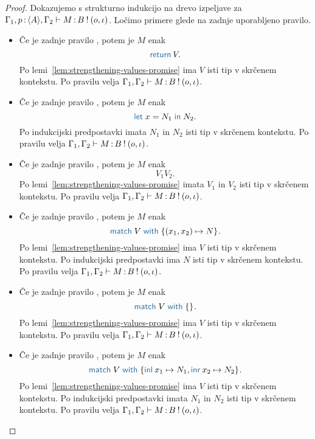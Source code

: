 \begin{proof}
	Dokazujemo s strukturno indukcijo na drevo izpeljave za $\Gamma_1, p \mathinner{:} \langle A \rangle, \Gamma_2 \vdash M \mathinner{:} B \mathbin{!} (o, \iota)$.
	Ločimo primere glede na zadnje uporabljeno pravilo.
	
	\begin{itemize}
		\item Če je zadnje pravilo , potem je $M$ enak $$\tmreturn{V}.$$
		Po lemi~\ref{lem:strengthening-values-promise} ima $V$ isti tip v skrčenem kontekstu.
		Po pravilu  velja $\Gamma_1, \Gamma_2 \vdash M \mathinner{:} B \mathbin{!} (o, \iota)$.
		
		\item Če je zadnje pravilo , potem je $M$ enak $$\tmlet{x}{N_1}{N_2}.$$
		Po indukcijski predpostavki imata $N_1$ in $N_2$ isti tip v skrčenem kontekstu.
		Po pravilu  velja $\Gamma_1, \Gamma_2 \vdash M \mathinner{:} B \mathbin{!} (o, \iota)$.
		
		\item Če je zadnje pravilo , potem je $M$ enak $$V_1 V_2.$$
		Po lemi~\ref{lem:strengthening-values-promise} imata $V_1$ in $V_2$ isti tip v skrčenem kontekstu.
		Po pravilu  velja $\Gamma_1, \Gamma_2 \vdash M \mathinner{:} B \mathbin{!} (o, \iota)$.
		
		\item Če je zadnje pravilo , potem je $M$ enak $$\tmmatch{V}{(x_1,x_2) \mapsto N}.$$ 
		Po lemi~\ref{lem:strengthening-values-promise} ima $V$ isti tip v skrčenem kontekstu.
		Po indukcijski predpostavki ima $N$ isti tip v skrčenem kontekstu.
		Po pravilu  velja $\Gamma_1, \Gamma_2 \vdash M \mathinner{:} B \mathbin{!} (o, \iota)$.
		
		\item Če je zadnje pravilo , potem je $M$ enak $$\tmmatch{V}{}.$$
		Po lemi~\ref{lem:strengthening-values-promise} ima $V$ isti tip v skrčenem kontekstu.
		Po pravilu  velja $\Gamma_1, \Gamma_2 \vdash M \mathinner{:} B \mathbin{!} (o, \iota)$.
		
		\item Če je zadnje pravilo , potem je $M$ enak $$\tmmatch{V}{\tminl{x_1} \mapsto N_1, \tminr{x_2} \mapsto N_2}.$$
		Po lemi~\ref{lem:strengthening-values-promise} ima $V$ isti tip v skrčenem kontekstu.
		Po indukcijski predpostavki imata $N_1$ in $N_2$ isti tip v skrčenem kontekstu.
		Po pravilu  velja $\Gamma_1, \Gamma_2 \vdash M \mathinner{:} B \mathbin{!} (o, \iota)$.
		

\end{itemize}
\end{proof}

